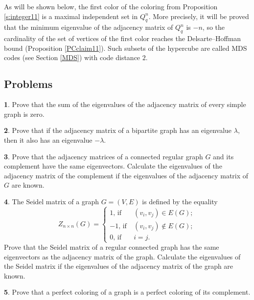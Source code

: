 \documentclass[11pt]{article}
\theoremstyle{definition}
\newtheorem{exercise}{\quad}
\begin{document}
As will be shown below, the first color of the  coloring from Proposition \ref{s:integer11}
is a maximal independent set in
$Q^n_q$. More precisely, it will be proved that the minimum eigenvalue
of the adjacency matrix of $Q_q^n$ is $-n$, so the cardinality
of the set of vertices of the first color reaches the
Delsarte--Hoffman bound (Proposition \ref{PCclaim11}).
Such subsets of the hypercube are called MDS codes (see Section  \ref{MDS})  with code
distance $2$.


\subsection{Problems}


\begin{exercise}\label{exe1} 
Prove that the sum of the eigenvalues of the adjacency matrix
of every simple graph is zero.
\end{exercise}


\begin{exercise} 
Prove that if the adjacency matrix of a bipartite graph
has an eigenvalue $\lambda$, then it also has an eigenvalue
$-\lambda$.
\end{exercise}

\begin{exercise}\label{exe3}
Prove that the adjacency matrices
of a connected regular graph $G$ and its complement have the same
eigenvectors. Calculate the eigenvalues of the adjacency matrix
of the complement if the eigenvalues of the adjacency matrix of
$G$ are known. 
\end{exercise}


\begin{exercise}
The Seidel matrix of a graph $G=(V,E)$ is defined by the equality
\[
Z_{n\times n}(G)= \left\{
\begin{array}{rr}
1 \mbox{, if}\ & (v_i,v_j) \in E(G);\\
-1\mbox{, if}\ & (v_i,v_j) \not \in E(G);\\
0\mbox{, if}\ & i=j.
\end{array}
\right.
\]
Prove that the Seidel matrix of a regular connected graph has the same
eigenvectors as the adjacency matrix of the graph. Calculate the
eigenvalues of the Seidel matrix if the eigenvalues
of the adjacency matrix of the graph are known. \end{exercise}



\begin{exercise}
Prove that a perfect coloring of a graph is a perfect
coloring of its complement.
\end{exercise}
\end{document}

